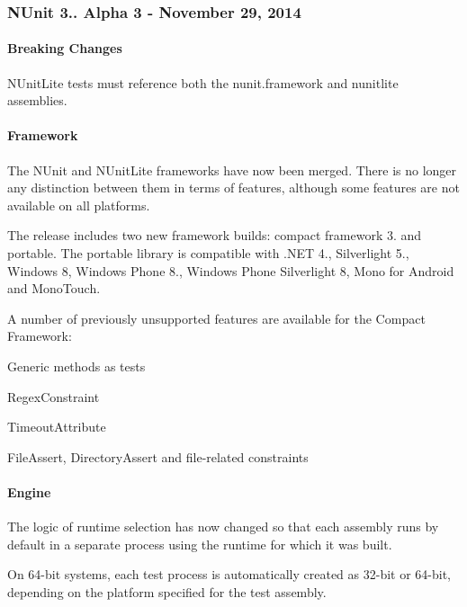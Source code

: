 \subsubsection*{N\+Unit 3.. Alpha 3 -\/ November 29, 2014}

\paragraph*{Breaking Changes}


\begin{DoxyItemize}
\item N\+Unit\+Lite tests must reference both the nunit.\+framework and nunitlite assemblies.
\end{DoxyItemize}

\paragraph*{Framework}


\begin{DoxyItemize}
\item The N\+Unit and N\+Unit\+Lite frameworks have now been merged. There is no longer any distinction between them in terms of features, although some features are not available on all platforms.
\item The release includes two new framework builds\+: compact framework 3. and portable. The portable library is compatible with .N\+ET 4., Silverlight 5., Windows 8, Windows Phone 8., Windows Phone Silverlight 8, Mono for Android and Mono\+Touch.
\item A number of previously unsupported features are available for the Compact Framework\+:
\begin{DoxyItemize}
\item Generic methods as tests
\item Regex\+Constraint
\item Timeout\+Attribute
\item File\+Assert, Directory\+Assert and file-\/related constraints
\end{DoxyItemize}
\end{DoxyItemize}

\paragraph*{Engine}


\begin{DoxyItemize}
\item The logic of runtime selection has now changed so that each assembly runs by default in a separate process using the runtime for which it was built.
\item On 64-\/bit systems, each test process is automatically created as 32-\/bit or 64-\/bit, depending on the platform specified for the test assembly.
\end{DoxyItemize}

